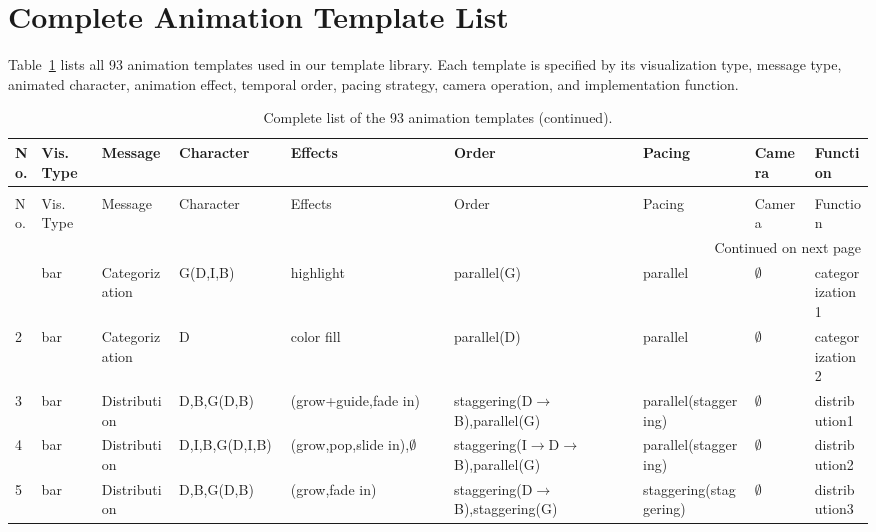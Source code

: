 
\appendix
\section{Complete Animation Template List}
\label{app:animation_templates}

Table~\ref{tab:complete_animation_templates} lists all 93 animation templates used in our template library. Each template is specified by its visualization type, message type, animated character, animation effect, temporal order, pacing strategy, camera operation, and implementation function.

\begin{landscape}
\scriptsize
\setlength{\tabcolsep}{2.8pt}
\renewcommand{\arraystretch}{1.15}
\begin{longtable}{p{0.035\linewidth}p{0.075\linewidth}p{0.09\linewidth}p{0.13\linewidth}p{0.19\linewidth}p{0.22\linewidth}p{0.13\linewidth}p{0.075\linewidth}p{0.08\linewidth}}
\caption{Complete list of the 93 animation templates.}
\label{tab:complete_animation_templates}\\
\toprule
No. & Vis. Type & Message & Character & Effects & Order & Pacing & Camera & Function \\
\midrule
\endfirsthead
\caption[]{Complete list of the 93 animation templates (continued).}\\
\toprule
No. & Vis. Type & Message & Character & Effects & Order & Pacing & Camera & Function \\
\midrule
\endhead
\midrule
\multicolumn{9}{r}{Continued on next page}\\
\endfoot
\bottomrule
\endlastfoot
1 & bar & Categorization & G(D,I,B) & highlight & parallel(G) & parallel & $\emptyset$ & categorization1 \\
2 & bar & Categorization & D & color fill & parallel(D) & parallel & $\emptyset$ & categorization2 \\
3 & bar & Distribution & D,B,G(D,B) & (grow+guide,fade in) & staggering(D$\rightarrow$B),parallel(G) & parallel(staggering) & $\emptyset$ & distribution1 \\
4 & bar & Distribution & D,I,B,G(D,I,B) & (grow,pop,slide in),$\emptyset$ & staggering(I$\rightarrow$D$\rightarrow$B),parallel(G) & parallel(staggering) & $\emptyset$ & distribution2 \\
5 & bar & Distribution & D,B,G(D,B) & (grow,fade in) & staggering(D$\rightarrow$B),staggering(G) & staggering(staggering) & $\emptyset$ & distribution3 \\

\end{longtable}
\end{landscape}

